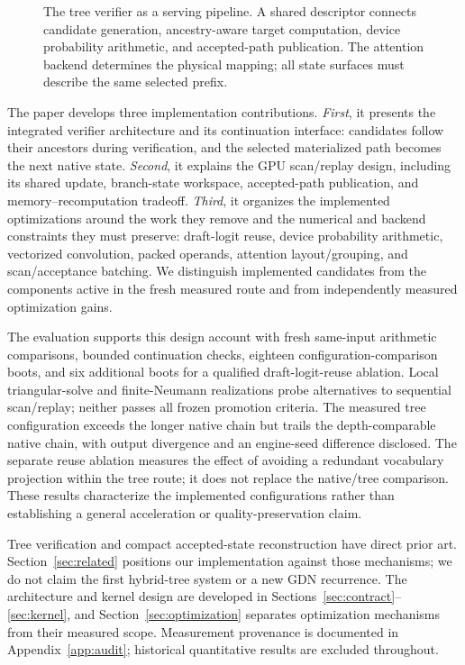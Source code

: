\documentclass[conference]{IEEEtran}
\begin{document}
\begin{figure}[t]
\centering

\caption{The tree verifier as a serving pipeline. A shared descriptor connects candidate generation, ancestry-aware target computation, device probability arithmetic, and accepted-path publication. The attention backend determines the physical mapping; all state surfaces must describe the same selected prefix.}
\label{fig:pipeline}
\end{figure}

The paper develops three implementation contributions. \textit{First}, it presents the integrated verifier architecture and its continuation interface: candidates follow their ancestors during verification, and the selected materialized path becomes the next native state. \textit{Second}, it explains the GPU scan/replay design, including its shared update, branch-state workspace, accepted-path publication, and memory--recomputation tradeoff. \textit{Third}, it organizes the implemented optimizations around the work they remove and the numerical and backend constraints they must preserve: draft-logit reuse, device probability arithmetic, vectorized convolution, packed operands, attention layout/grouping, and scan/acceptance batching. We distinguish implemented candidates from the components active in the fresh measured route and from independently measured optimization gains.

The evaluation supports this design account with fresh same-input arithmetic comparisons, bounded continuation checks, eighteen configuration-comparison boots, and six additional boots for a qualified draft-logit-reuse ablation. Local triangular-solve and finite-Neumann realizations probe alternatives to sequential scan/replay; neither passes all frozen promotion criteria. The measured tree configuration exceeds the longer native chain but trails the depth-comparable native chain, with output divergence and an engine-seed difference disclosed. The separate reuse ablation measures the effect of avoiding a redundant vocabulary projection within the tree route; it does not replace the native/tree comparison. These results characterize the implemented configurations rather than establishing a general acceleration or quality-preservation claim.

Tree verification and compact accepted-state reconstruction have direct prior art. Section~\ref{sec:related} positions our implementation against those mechanisms; we do not claim the first hybrid-tree system or a new GDN recurrence. The architecture and kernel design are developed in Sections~\ref{sec:contract}--\ref{sec:kernel}, and Section~\ref{sec:optimization} separates optimization mechanisms from their measured scope. Measurement provenance is documented in Appendix~\ref{app:audit}; historical quantitative results are excluded throughout.
\end{document}
